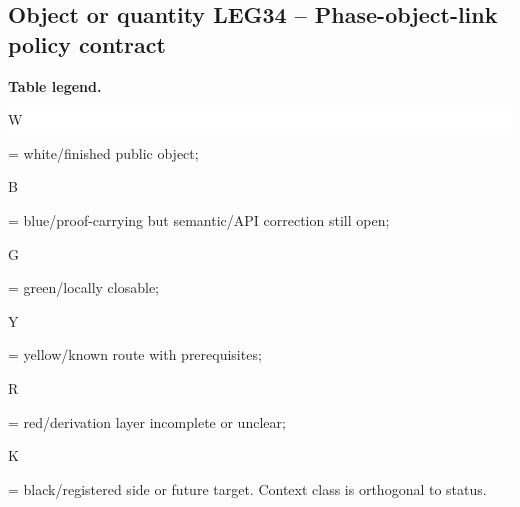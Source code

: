 \subsection*{Object or quantity LEG34 -- Phase-object-link policy contract}
\hypertarget{objproof:LEG34}{}
\par\smallskip\noindent\begin{minipage}{0.99\linewidth}\footnotesize\raggedright\textbf{Table legend.} \colorbox{white}{\strut W} = white/finished public object; \colorbox{cyan!20}{\strut B} = blue/proof-carrying but semantic/API correction still open; \colorbox{green!18}{\strut G} = green/locally closable; \colorbox{yellow!25}{\strut Y} = yellow/known route with prerequisites; \colorbox{red!20}{\strut R} = red/derivation layer incomplete or unclear; \colorbox{black!18}{\strut K} = black/registered side or future target. Context class is orthogonal to status.\end{minipage}\par\vspace{0.25em}
